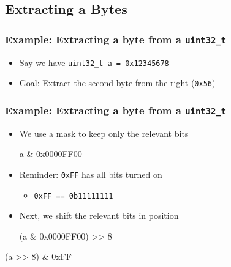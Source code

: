 \subsection{Extracting a Bytes}
\frame{\tableofcontents[currentsubsection]}

\begin{frame}
  \frametitle{Example: Extracting a byte from a \texttt{uint32\_t}}
  \begin{itemize}
    \item Say we have \texttt{uint32\_t a = 0x12345678}
    \item Goal: Extract the second byte from the right (\texttt{0x56})
  \end{itemize}
\end{frame}

\begin{frame}
  \frametitle{Example: Extracting a byte from a \texttt{uint32\_t}}
  \begin{itemize}
    \item We use a mask to keep only the relevant bits
          \begin{center} \ttfamily
            a \& 0x0000FF00
          \end{center}
    \item Reminder: \texttt{0xFF} has all bits turned on
          \begin{itemize}
            \item \texttt{0xFF == 0b11111111}
          \end{itemize}
    \item Next, we shift the relevant bits in position
          \begin{center} \ttfamily
            (a \& 0x0000FF00) >> 8
          \end{center}
  \end{itemize}
  \vskip4mm
  \begin{center} \ttfamily
    (a >> 8) \& 0xFF
  \end{center}
\end{frame}
